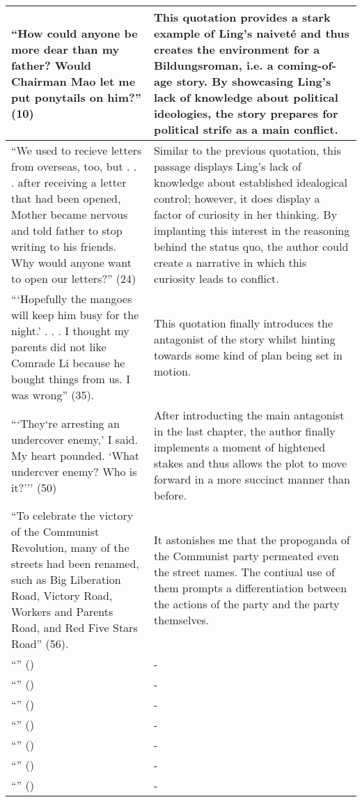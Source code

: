 \documentclass[12pt]{article}
\begin{document}
\begin{tabularx}{\textwidth}{ |X|X| }
  \hline
  ``How could anyone be more dear than my father? Would Chairman Mao let me put ponytails on him?'' (10) & This quotation provides a stark example of Ling's naiveté and thus creates the environment for a Bildungsroman, i.e. a coming-of-age story. By showcasing Ling's lack of knowledge about political ideologies, the story prepares for political strife as a main conflict.  \\
  \hline
  ``We used to recieve letters from overseas, too, but . . . after receiving a letter that had been opened, Mother became nervous and told father to stop writing to his friends. Why would anyone want to open our letters?'' (24) & Similar to the previous quotation, this passage displays Ling's lack of knowledge about established idealogical control; however, it does display a factor of curiosity in her thinking. By implanting this interest in the reasoning behind the status quo, the author could create a narrative in which this curiosity leads to conflict.  \\
  \hline
  ```Hopefully the mangoes will keep him busy for the night.' . . . I thought my parents did not like Comrade Li because he bought things from us. I was wrong'' (35). & This quotation finally introduces the antagonist of the story whilst hinting towards some kind of plan being set in motion. \\
  \hline
  ```They`re arresting an undercover enemy,' I said. My heart pounded. `What undercver enemy? Who is it?''' (50) & After introducting the main antagonist in the last chapter, the author finally implements a moment of hightened stakes and thus allows the plot to move forward in a more succinct manner than before. \\
  \hline
  ``To celebrate the victory of the Communist Revolution, many of the streets had been renamed, such as Big Liberation Road, Victory Road, Workers and Parents Road, and Red Five Stars Road'' (56). & It astonishes me that the propoganda of the Communist party permeated even the street names. The contiual use of them prompts a differentiation between the actions of the party and the party themselves. \\
  \hline
  ``'' () & - \\
  \hline
  ``'' () & - \\
  \hline
  ``'' () & - \\
  \hline
  ``'' () & - \\
  \hline
  ``'' () & - \\
  \hline
  ``'' () & - \\
  \hline
  ``'' () & - \\
  \hline


\end{tabularx}
\end{document}
